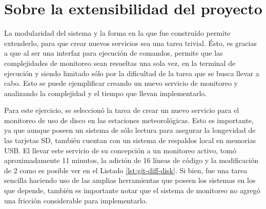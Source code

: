 

\section{Sobre la extensibilidad del proyecto}

La modularidad del sistema y la forma en la que fue construído permite extenderlo, para que crear nuevos servicios sea una tarea trivial. Ésto, es gracias a que al ser una interfaz para ejecución de comandos, permite que las complejidades de monitoreo sean resueltas una sola vez, en la terminal de ejecución y siendo limitado sólo por la dificultad de la tarea que se busca llevar a cabo. Esto se puede ejemplificar creando un nuevo servicio de monitoreo y analizando la complejidad y el tiempo que llevan implementarlo.

Para este ejercicio, se seleccionó la tarea de crear un nuevo servicio para el monitoreo de uso de disco en las estaciones meteorológicas. Esto es importante, ya que aunque poseen un sistema de sólo lectura para asegurar la longevidad de las tarjetas SD, también cuentan con un sistema de respaldos local en memorias USB. El llevar este servicio de su concepción a un monitoreo activo, tomó aproximadamente 11 minutos, la adición de 16 líneas de código y la modificación de 2 como es posible ver en el Listado \ref{lst:git-diff-disk}. Si bien, fue una tarea sencilla haciendo uso de las amplias herramientas que poseen los sistemas en los que depende, también es importante notar que el sistema de monitoreo no agregó una fricción considerable para implementarlo.

